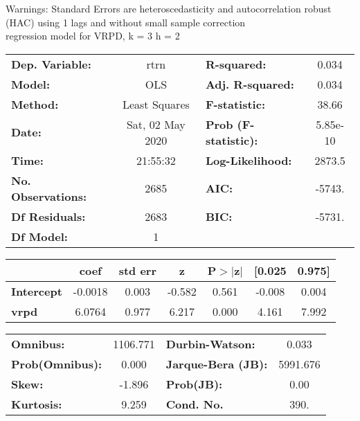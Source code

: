 Warnings: \newline
 [1] Standard Errors are heteroscedasticity and autocorrelation robust (HAC) using 1 lags and without small sample correction\\ 

regression model for VRPD, k = 3 h = 2\begin{center}
\begin{tabular}{lclc}
\toprule
\textbf{Dep. Variable:}    &       rtrn       & \textbf{  R-squared:         } &     0.034   \\
\textbf{Model:}            &       OLS        & \textbf{  Adj. R-squared:    } &     0.034   \\
\textbf{Method:}           &  Least Squares   & \textbf{  F-statistic:       } &     38.66   \\
\textbf{Date:}             & Sat, 02 May 2020 & \textbf{  Prob (F-statistic):} &  5.85e-10   \\
\textbf{Time:}             &     21:55:32     & \textbf{  Log-Likelihood:    } &    2873.5   \\
\textbf{No. Observations:} &        2685      & \textbf{  AIC:               } &    -5743.   \\
\textbf{Df Residuals:}     &        2683      & \textbf{  BIC:               } &    -5731.   \\
\textbf{Df Model:}         &           1      & \textbf{                     } &             \\
\bottomrule
\end{tabular}
\begin{tabular}{lcccccc}
                   & \textbf{coef} & \textbf{std err} & \textbf{z} & \textbf{P$> |$z$|$} & \textbf{[0.025} & \textbf{0.975]}  \\
\midrule
\textbf{Intercept} &      -0.0018  &        0.003     &    -0.582  &         0.561        &       -0.008    &        0.004     \\
\textbf{vrpd}      &       6.0764  &        0.977     &     6.217  &         0.000        &        4.161    &        7.992     \\
\bottomrule
\end{tabular}
\begin{tabular}{lclc}
\textbf{Omnibus:}       & 1106.771 & \textbf{  Durbin-Watson:     } &    0.033  \\
\textbf{Prob(Omnibus):} &   0.000  & \textbf{  Jarque-Bera (JB):  } & 5991.676  \\
\textbf{Skew:}          &  -1.896  & \textbf{  Prob(JB):          } &     0.00  \\
\textbf{Kurtosis:}      &   9.259  & \textbf{  Cond. No.          } &     390.  \\
\bottomrule
\end{tabular}
\end{center}

